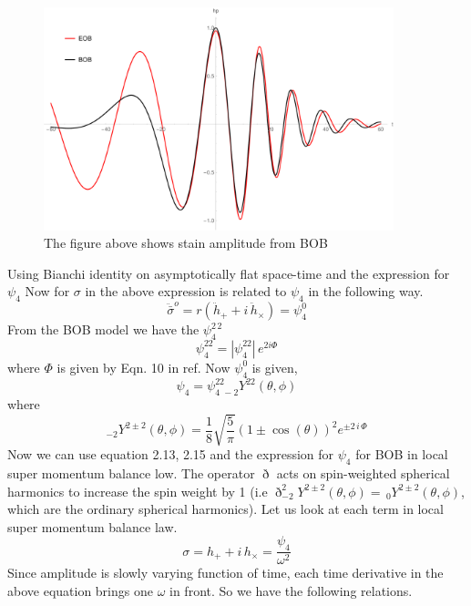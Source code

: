 \documentclass[prd,preprintnumbers,onecolumn,eqsecnum,floatfix,letter]{revtex4}
\begin{document}
\begin{figure}
	\includegraphics[width=4.0in]{../plots/SigmaSqr.pdf}
	\caption{The figure above shows stain amplitude from BOB}
	\label{fig:SigmaSqr}
\end{figure} 
Using Bianchi identity on asymptotically flat space-time and the expression for $\psi_{4}$
Now for $\sigma$ in the above expression is related to $\psi_4$ in the following way.
\begin{equation}
	\ddot{\bar{\sigma}}^{o} = r\left(\ddot{h}_{+} + i\, \ddot{h}_{\times}  \right)
	\label{psi4} = \psi_{4}^{0}
\end{equation} 
From the BOB model we have the $\psi_{4}^{2\,2}$ 
\begin{equation}
	\psi_{4}^{22} = |\psi_{4}^{22}|\, e^{2i\Phi}
\end{equation}
where $\Phi$ is given by Eqn. 10 in ref\cite{McWilliams_2019}. Now $\psi_{4}^{0}$ is given,
\begin{equation}
	\psi_{4} = \psi^{22}_{4\,\,-2}Y^{22}(\theta, \phi)
\end{equation}
where
\begin{equation}
	_{-2}Y^{2\pm 2}(\theta,\phi) = \frac{1}{8}\sqrt{\frac{5}{\pi}}\left(1 \pm \cos(\theta)\right)^{2}e^{\pm 2\,i\,\Phi}
\end{equation}
Now we can use equation 2.13, 2.15 and the expression for $\psi_{4}$ for BOB in local super momentum balance low. The operator $\eth$ acts on spin-weighted spherical harmonics to increase the spin weight by 1 (i.e $\eth^2 _{-2}Y^{2\pm 2}(\theta,\phi) = \,_{0}Y^{2\pm 2}(\theta,\phi)$, which are the ordinary spherical harmonics). Let us look at each term in local super momentum balance law.
\begin{equation}
	\sigma = h_{+} + i\,h_{\times} = \frac{\psi_{4}}{\omega^2}
\end{equation}   
Since amplitude is slowly varying function of time, each time derivative in the above equation brings one $\omega$ in front. So we have the following relations.
\end{document}
